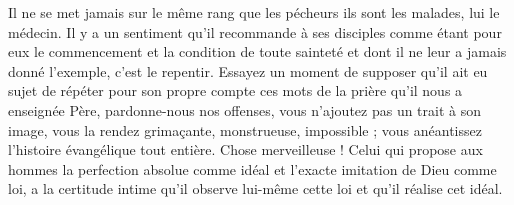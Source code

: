 Il ne se met jamais sur le même rang que les pécheurs\frcolon{} ils sont les malades, lui le médecin.
Il y a un sentiment qu’il recommande à ses disciples comme étant pour eux le commencement et la condition de toute sainteté et dont il ne leur a jamais donné l’exemple, c’est le repentir. Essayez un moment de supposer qu’il ait eu sujet de répéter pour son propre compte ces mots de la prière qu’il nous a enseignée\frcolon{} \Og{} Père, pardonne-nous nos offenses\Fg{}, vous n’ajoutez pas un trait à son image, vous la rendez grimaçante, monstrueuse, impossible ; vous anéantissez l’histoire évangélique tout entière. Chose merveilleuse ! Celui qui propose aux hommes la perfection absolue comme idéal et l’exacte imitation de Dieu comme loi, a la certitude intime qu’il observe lui-même cette loi et qu’il réalise cet idéal.

